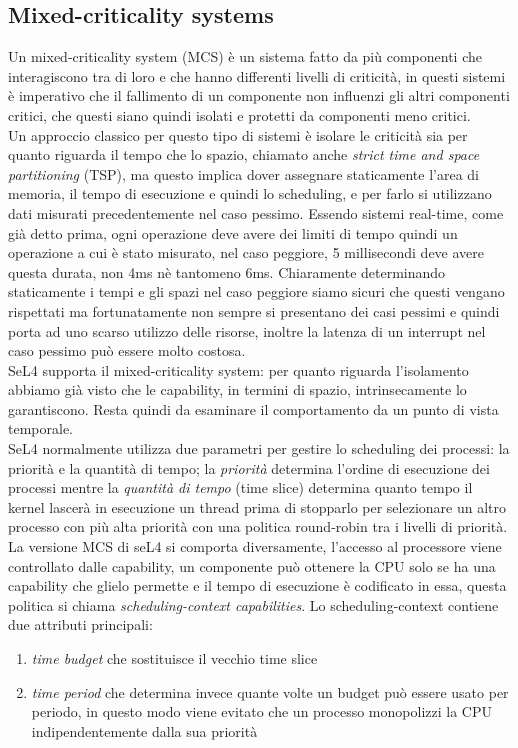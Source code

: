 \subsection{Mixed-criticality systems}
Un mixed-criticality system (MCS) è un sistema fatto da più componenti che interagiscono tra di loro e che hanno differenti livelli di criticità, in questi sistemi è imperativo che il fallimento di un componente non influenzi gli altri componenti critici, che questi siano quindi isolati e protetti da componenti meno critici.\\
Un approccio classico per questo tipo di sistemi è isolare le criticità sia per quanto riguarda il tempo che lo spazio, chiamato anche \textit{strict time and space partitioning} (TSP), ma questo implica dover assegnare staticamente l'area di memoria, il tempo di esecuzione e quindi lo scheduling, e per farlo si utilizzano dati misurati precedentemente nel caso pessimo. Essendo sistemi real-time, come già detto prima, ogni operazione deve avere dei limiti di tempo quindi un operazione a cui è stato misurato, nel caso peggiore, 5 millisecondi deve avere questa durata, non 4ms nè tantomeno 6ms. Chiaramente determinando staticamente i tempi e gli spazi nel caso peggiore siamo sicuri che questi vengano rispettati ma fortunatamente non sempre si presentano dei casi pessimi e quindi porta ad uno scarso utilizzo delle risorse, inoltre la latenza di un interrupt nel caso pessimo può essere molto costosa.\\
SeL4 supporta il mixed-criticality system: per quanto riguarda l'isolamento abbiamo già visto che le capability, in termini di spazio, intrinsecamente lo garantiscono. Resta quindi da esaminare il comportamento da un punto di vista temporale.\\
SeL4 normalmente utilizza due parametri per gestire lo scheduling dei processi: la priorità e la quantità di tempo; la \textit{priorità} determina l'ordine di esecuzione dei processi mentre la \textit{quantità di tempo} (time slice) determina quanto tempo il kernel lascerà in esecuzione un thread prima di stopparlo per selezionare un altro processo con più alta priorità con una politica round-robin tra i livelli di priorità. \\
La versione MCS di seL4 si comporta diversamente, l'accesso al processore viene controllato dalle capability, un componente può ottenere la CPU solo se ha una capability che glielo permette e il tempo di esecuzione è codificato in essa, questa politica si chiama \textit{scheduling-context capabilities}. Lo scheduling-context contiene due attributi principali: 
\begin{enumerate}
	\item \textit{time budget} che sostituisce il vecchio time slice
	\item \textit{time period} che determina invece quante volte un budget può essere usato per periodo, in questo modo viene evitato che un processo monopolizzi la CPU indipendentemente dalla sua priorità
\end{enumerate}

